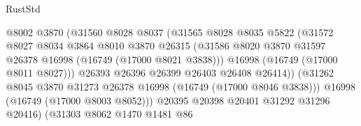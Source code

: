 \begin{lexlean}{RustStd}
\begin{coremodule}
                                        @8002
                                        @3870
                                        (@31560
                                          @8028
                                          @8037
                                          (@31565
                                            @8028
                                            @8035
                                            @5822
                                            (@31572
                                              @8027
                                              @8034
                                              @3864
                                              @8010
                                              @3870
                                              @26315
                                              (@31586
                                                @8020
                                                @3870
                                                @31597
                                                @26378
                                                @16998
                                                (@16749 (@17000 @8021 @3838)))
                                              @16998
                                              (@16749 (@17000 @8011 @8027)))
                                            @26393
                                            @26396
                                            @26399
                                            @26403
                                            @26408
                                            @26414))
                                        (@31262
                                          @8045
                                          @3870
                                          @31273
                                          @26378
                                          @16998
                                          (@16749 (@17000 @8046 @3838)))
                                        @16998
                                        (@16749 (@17000 @8003 @8052)))
                                      @20395
                                      @20398
                                      @20401
                                      @31292
                                      @31296
                                      @20416)
                                    (@31303
                                      @8062
                                      @1470
                                      @1481
                                      @86

\end{coremodule}
\end{lexlean}
